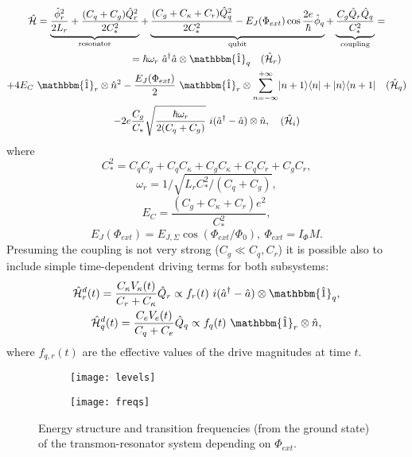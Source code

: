 \begin{equation}
\begin{gathered}
\mathcal{\hat H} =  \underbrace{\frac{\hat \phi_r^2}{2 L_r} + \frac{(C_q+C_g) \hat Q_r^2}{2C_*^2}}_\text{resonator} 
+ \underbrace{\frac{(C_g + C_\kappa + C_r) \hat Q^2_q}{2C_*^2} - E_J (\Phi_{ext}) \cos \frac{2e}{\hbar}\hat \phi_q }_\text{qubit}
+ \underbrace{\frac{C_g\hat Q_r \hat Q_q}{C_*^2}}_\text{coupling} = \\
=  \hbar\omega_r\ \hat a^\dag \hat a \otimes \mathbbm{\hat 1}_q \quad (\mathcal{\hat H}_r) \\
+ 4 E_C\ \mathbbm{\hat 1}_r \otimes \hat n^2 - \frac{E_J(\Phi_{ext})}{2}\ \mathbbm{\hat 1}_r\otimes \sum_{n=-\infty}^{+\infty} \ket{n+1}\bra{n} + \ket{n}\bra{n+1} \quad (\mathcal{\hat H}_q) \\
- 2e \frac{C_g}{C_*} \sqrt{\frac{\hbar \omega_r }{2(C_q+C_g)}}\ i(\hat a^\dag - \hat a) \otimes \hat n, \quad (\mathcal{\hat H}_i)
\end{gathered}\label{eq:hamiltonian}
\end{equation}
where 
$$C_*^2 = C_q C_g + C_q C_\kappa + C_g C_\kappa + C_q C_r + C_g C_r, $$
$$\omega_r = 1/\sqrt{L_r C_*^2/(C_q+C_g)}, $$
$$E_C = \frac{(C_g+C_\kappa+C_r)e^2}{C_*^2}, $$
$$E_J(\Phi_{ext}) = E_{J,\Sigma} \cos(\Phi_{ext}/\Phi_0),\ \Phi_{ext} = I_\Phi M.$$
Presuming the coupling is not very strong ($C_g \ll C_q, C_r$) it is possible also to include simple time-dependent driving terms for both subsystems:
\begin{gather}
\mathcal{\hat H}_r^d(t) = \frac{C_\kappa V_\kappa(t)}{C_r + C_\kappa} \hat Q_r \propto f_r(t)\ i(\hat a^\dag - \hat a) \otimes \mathbbm{\hat 1}_q, \notag \\
\mathcal{\hat H}_q^d(t) = \frac{C_e V_e(t)}{C_q + C_e} \hat Q_q \propto f_q(t)\  \mathbbm{\hat 1}_r \otimes \hat n,
\label{eq:driving_q}
\end{gather}
where $f_{q, r} (t)$ are the effective values of the drive magnitudes at time $t$.

\begin{figure}
\centering
\begin{subfigure}[t]{\textwidth}
\centering
\texttt{[image: levels]}
\end{subfigure}

\begin{subfigure}[t]{\textwidth}
\centering
\texttt{[image: freqs]}
\end{subfigure}
\caption{Energy structure and transition frequencies (from the ground state) of the transmon-resonator system depending on $\Phi_{ext}$.}
\label{fig:levels}
\end{figure}


